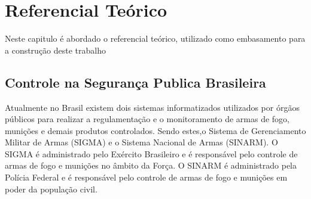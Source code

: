 
 
\chapter{Referencial Teórico}\label{referecial_teorico}

Neste capitulo é abordado o referencial teórico, utilizado como embasamento para a construção deste trabalho
\section{ Controle na Segurança Publica Brasileira }
Atualmente no Brasil existem dois sistemas informatizados utilizados por órgãos públicos para realizar a regulamentação e o monitoramento de armas de fogo, munições e demais produtos controlados.
Sendo estes,o Sistema de Gerenciamento Militar de Armas (SIGMA) e o Sistema Nacional de Armas (SINARM). O SIGMA é administrado pelo Exército Brasileiro e é responsável pelo controle de armas de fogo e munições no âmbito da Força. O SINARM é administrado pela Polícia Federal e é responsável pelo controle de armas de fogo e munições em poder da população civil.\cite{shotEntendaSinarm}

